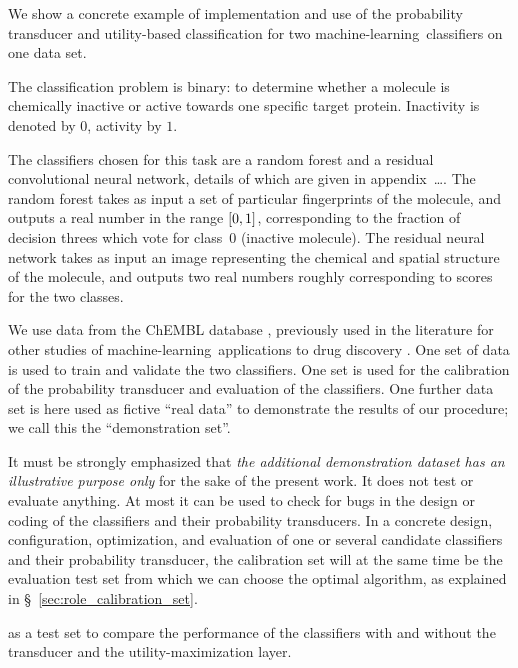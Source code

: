 \documentclass[\ifafour a4paper,12pt,\else a5paper,10pt,\fi%
onecolumn,oneside,article,%
british%
]{memoir}
\theoremstyle{remark}
\theoremstyle{innote}
\newcommand*{\pencil}{{\fontencoding{U}\fontfamily{fontawesometwo}\selectfont\symbol{210}}}
\newcommand{\mynotep}[1]{{\footnotesize\color{notecolour}\pencil\ #1}}
\DeclarePairedDelimiter\clcl{[}{]}
\renewcommand*{\|}[1][]{\nonscript\:#1\vert\nonscript\:\mathopen{}}
\newcommand*{\sect}{\S}%
\newcommand*{\ml}{machine-learning}
\begin{document}
We show a concrete example of implementation and use of the probability transducer and utility-based classification for two \ml\ classifiers on one data set.

The classification problem is binary: to determine whether a molecule is chemically inactive or active towards one specific target protein. Inactivity is denoted by $0$, activity by $1$.

The classifiers chosen for this task are a random forest and a residual convolutional neural network, details of which are given in appendix\mynotep{\ldots}. The random forest takes as input a set of particular fingerprints of the molecule, and outputs a real number in the range $\clcl{0,1}$, corresponding to the fraction of decision threes which vote for class~$0$ (inactive molecule). The residual neural network takes as input an image representing the chemical and spatial structure of the molecule, and outputs two real numbers roughly corresponding to scores for the two classes.

We use data from the ChEMBL database \autocites{bentoetal2014}, previously used in the literature for other studies of \ml\ applications to drug discovery \autocites{koutsoukasetal2017}. One set of data is used to train and validate the two classifiers. One set is used for the calibration of the probability transducer and evaluation of the classifiers. One further data set is here used as fictive \enquote{real data} to demonstrate the results of our procedure; we call this the \enquote{demonstration set}.

It must be strongly emphasized that \emph{the additional demonstration dataset has an illustrative purpose only} for the sake of the present work. It does not test or evaluate anything. At most it can be used to check for bugs in the design or coding of the classifiers and their probability transducers. In a concrete design, configuration, optimization, and evaluation of one or several candidate classifiers and their probability transducer, the calibration set will at the same time be the evaluation test set from which we can choose the optimal algorithm, as explained in \sect~\ref{sec:role_calibration_set}.


as a test set to compare the performance of the classifiers with and without the transducer and the utility-maximization layer.
\end{document}

